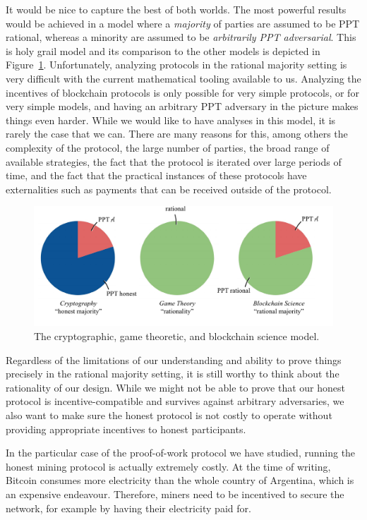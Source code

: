 It would be nice to capture the best of both worlds. The most powerful
results would be achieved in a model where a \emph{majority} of parties
are assumed to be PPT rational, whereas a minority are assumed to be
\emph{arbitrarily PPT adversarial}. This is holy grail model and its
comparison to the other models is depicted in Figure~\ref{fig.rationality}.
Unfortunately, analyzing protocols in the rational majority setting
is very difficult with the current mathematical tooling available to us.
Analyzing the incentives of blockchain protocols is only possible for
very simple protocols, or for very simple models, and having an arbitrary
PPT adversary in the picture makes things even harder. While we would
like to have analyses in this model, it is rarely the case that we can.
There are many reasons for this, among others the complexity of the protocol,
the large number of parties, the broad range of available strategies,
the fact that the protocol is iterated over large periods of time,
and the fact that the practical instances of these protocols have externalities
such as payments that can be received outside of the protocol.

\begin{figure}[h]
  \centering
  \includegraphics[width=\columnwidth,keepaspectratio]{figures/rational-model.pdf}
  \caption{The cryptographic, game theoretic, and blockchain science model.}
  \label{fig.rationality}
\end{figure}

Regardless of the limitations of our understanding and ability to prove
things precisely in the rational majority setting, it is still worthy
to think about the rationality of our design. While we might not be able
to prove that our honest protocol is incentive-compatible and survives against
arbitrary adversaries, we also want to make sure the honest protocol is
not costly to operate without providing appropriate incentives to honest
participants.

In the particular case of the proof-of-work protocol we have studied,
running the honest mining protocol is actually extremely costly. At the time of
writing, Bitcoin consumes more electricity than the whole country of Argentina,
which is an expensive endeavour. Therefore, miners need to be incentived to
secure the network, for example by having their electricity paid for.

